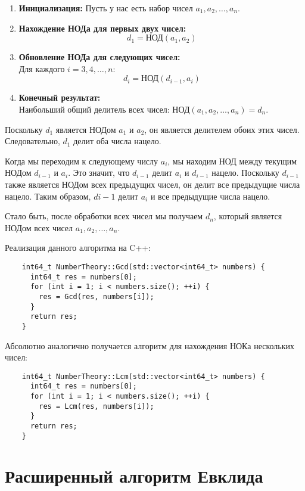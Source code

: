 \documentclass[12pt, a4paper, openany]{book}
\begin{document}
\begin{enumerate}
    \item \textbf{Инициализация:} Пусть у нас есть набор чисел \(a_1, a_2, \ldots, a_n\).
    \item \textbf{Нахождение НОДа для первых двух чисел:}
    \[ d_1 = \text{НОД}(a_1, a_2) \]
    \item \textbf{Обновление НОДа для следующих чисел:} \\
    Для каждого \(i = 3, 4, \ldots, n\):
    \[ d_i = \text{НОД}(d_{i-1}, a_i) \]
    \item \textbf{Конечный результат:} \\
    Наибольший общий делитель всех чисел: НОД\((a_1, a_2, \ldots, a_n) = d_n\).
\end{enumerate}

    Поскольку $d_1$ является НОДом $a_1$ и $a_2$, он является делителем обоих этих чисел. Следовательно, $d_1$ делит оба числа нацело.
    
    Когда мы переходим к следующему числу $a_i$, мы находим НОД между текущим НОДом $d_{i-1}$ и $a_i$. Это значит, что $d_{i-1}$ делит $a_i$ и $d_{i-1}$ нацело. Поскольку $d_{i-1}$ также является НОДом всех предыдущих чисел, он делит все предыдущие числа нацело. Таким образом, $d{i-1}$ делит $a_i$ и все предыдущие числа нацело.
    
    Стало быть, после обработки всех чисел мы получаем $d_n$, который является НОДом всех чисел $a_1, a_2, …,a_n$.

\newpage
\noindent
    Реализация данного алгоритма на C++:

\begin{lstlisting}
    int64_t NumberTheory::Gcd(std::vector<int64_t> numbers) {
      int64_t res = numbers[0];
      for (int i = 1; i < numbers.size(); ++i) {
        res = Gcd(res, numbers[i]);
      }
      return res;
    }
\end{lstlisting}

\noindent
    Абсолютно аналогично получается алгоритм для нахождения НОКа нескольких чисел:

\begin{lstlisting}
    int64_t NumberTheory::Lcm(std::vector<int64_t> numbers) {
      int64_t res = numbers[0];
      for (int i = 1; i < numbers.size(); ++i) {
        res = Lcm(res, numbers[i]);
      }
      return res;
    }
\end{lstlisting}

\section{Расширенный алгоритм Евклида}
\end{document}
